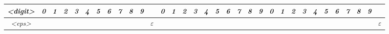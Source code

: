 \documentclass[10pt,a1paper]{memoir}
\begin{document}
\begin{center}
\begin{tabular}{ |c||c|c|c|c|c|c|c|c|c|c|c|c|c|c|c|c|c|c|c|c|c|c|c|c|c|c|c|c|c|c|c|c| }
\textsl{\textless digit\textgreater} & \textit{0} & \textit{1} & \textit{2} & \textit{3} & \textit{4} & \textit{5} & \textit{6} & \textit{7} & \textit{8} & \textit{9} &  & \textit{0} & \textit{1} & \textit{2} & \textit{3} & \textit{4} & \textit{5} & \textit{6} & \textit{7} & \textit{8} & \textit{9} & \textit{0} & \textit{1} & \textit{2} & \textit{3} & \textit{4} & \textit{5} & \textit{6} & \textit{7} & \textit{8} & \textit{9} & \\ \hline
\textsl{\textless eps\textgreater} &  &  &  &  &  &  &  &  &  &  & $\varepsilon$ &  &  &  &  &  &  &  &  &  &  &  &  &  &  &  &  &  &  &  &  & $\varepsilon$\\
\hline
\end{tabular}

\end{center}
\end{document}
